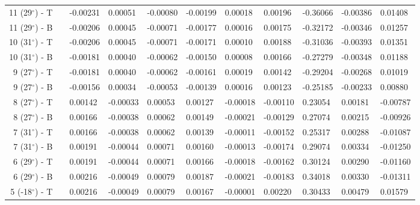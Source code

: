 \begin{table}[H]
\begin{longtable}{@{}rllllllllll@{}}
  11 (29$^\circ$) - T &&      -0.00231 &       0.00051 &      -0.00080 &      -0.00199 &       0.00018 &       0.00196 &    -0.36066 &    -0.00386 &     0.01408 \\
  11 (29$^\circ$) - B &&      -0.00206 &       0.00045 &      -0.00071 &      -0.00177 &       0.00016 &       0.00175 &    -0.32172 &    -0.00346 &     0.01257 \\\midrule
  10 (31$^\circ$) - T &&      -0.00206 &       0.00045 &      -0.00071 &      -0.00171 &       0.00010 &       0.00188 &    -0.31036 &    -0.00393 &     0.01351 \\
  10 (31$^\circ$) - B &&      -0.00181 &       0.00040 &      -0.00062 &      -0.00150 &       0.00008 &       0.00166 &    -0.27279 &    -0.00348 &     0.01188 \\\midrule
   9 (27$^\circ$) - T &&      -0.00181 &       0.00040 &      -0.00062 &      -0.00161 &       0.00019 &       0.00142 &    -0.29204 &    -0.00268 &     0.01019 \\
   9 (27$^\circ$) - B &&      -0.00156 &       0.00034 &      -0.00053 &      -0.00139 &       0.00016 &       0.00123 &    -0.25185 &    -0.00233 &     0.00880 \\\midrule
   8 (27$^\circ$) - T &&       0.00142 &      -0.00033 &       0.00053 &       0.00127 &      -0.00018 &      -0.00110 &     0.23054 &     0.00181 &    -0.00787 \\
   8 (27$^\circ$) - B &&       0.00166 &      -0.00038 &       0.00062 &       0.00149 &      -0.00021 &      -0.00129 &     0.27074 &     0.00215 &    -0.00926 \\\midrule
   7 (31$^\circ$) - T &&       0.00166 &      -0.00038 &       0.00062 &       0.00139 &      -0.00011 &      -0.00152 &     0.25317 &     0.00288 &    -0.01087 \\
   7 (31$^\circ$) - B &&       0.00191 &      -0.00044 &       0.00071 &       0.00160 &      -0.00013 &      -0.00174 &     0.29074 &     0.00334 &    -0.01250 \\\midrule
   6 (29$^\circ$) - T &&       0.00191 &      -0.00044 &       0.00071 &       0.00166 &      -0.00018 &      -0.00162 &     0.30124 &     0.00290 &    -0.01160 \\
   6 (29$^\circ$) - B &&       0.00216 &      -0.00049 &       0.00079 &       0.00187 &      -0.00021 &      -0.00183 &     0.34018 &     0.00330 &    -0.01311 \\\midrule
  5 (-18$^\circ$) - T &&       0.00216 &      -0.00049 &       0.00079 &       0.00167 &      -0.00001 &       0.00220 &     0.30433 &     0.00479 &     0.01579 \\

\end{longtable}
\end{table}
